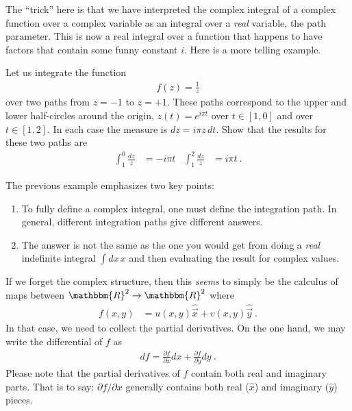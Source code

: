 The ``trick'' here is that we have interpreted the complex integral of a complex function over a complex variable as an integral over a \emph{real} variable, the path parameter. This is now a real integral over a function that happens to have factors that contain some funny constant $i$.  Here is a more telling example. 
\begin{exercise}
Let us integrate the function
\begin{align}
  f(z) = \frac{1}{z}
\end{align}
over two paths from $z=-1$ to $z=+1$. These paths correspond to the upper and lower half-circles around the origin, $z(t)= e^{i\pi t} $ over $t\in[1,0]$ and over $t\in[1,2]$. In each case the measure is $dz = i\pi z \, dt$. Show that the results for these two paths are
\begin{align}
  \int_1^0 \frac{dz}{z} &= -i\pi t 
  &
  \int_1^2 \frac{dz}{z} &= i\pi t  \ .
\end{align}
\end{exercise}
The previous example emphasizes two key points:
\begin{enumerate}
  \item To fully define a complex integral, one must define the integration path. In general, different integration paths give different answers. 
  \item The answer is not the same as the one you would get from doing a \emph{real} indefinite integral $\int dx\, x$ and then evaluating the result for complex values.
\end{enumerate}

If we forget the complex structure, then this \emph{seems} to simply be the calculus of maps between $\mathbbm{R}^2 \to \mathbbm{R}^2$ where
\begin{align}
  f(x,y) &= u(x,y) \hat{\vec{x}} + v(x,y)\hat{\vec{y}} \ .
\end{align}
In that case, we need to collect the partial derivatives. On the one hand, we may write the differential of $f$ as
\begin{align}
  df = \frac{\partial f}{\partial x} dx + \frac{\partial f}{\partial y} dy \ .
\end{align}
Please note that the partial derivatives of $f$ contain both real and imaginary parts. That is to say: $\partial f/\partial x$ generally contains both real ($\hat x$) and imaginary ($\hat y$) pieces. 

